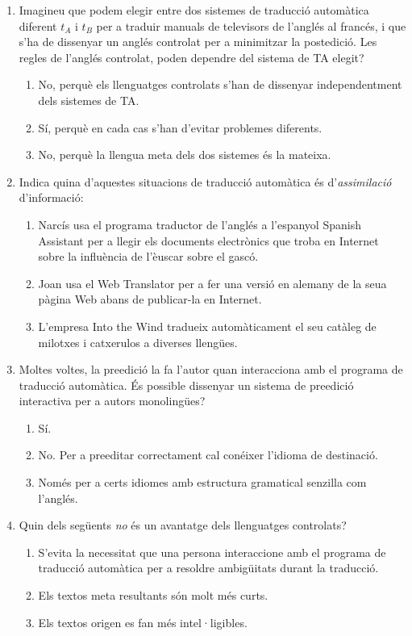 \begin{enumerate}
\item Imagineu que podem elegir entre dos sistemes de traducció
  automàtica diferent $t_A$ i $t_B$ per a traduir manuals de
  televisors de l'anglés al francés, i que s'ha de dissenyar un anglés
  controlat per a minimitzar la postedició. Les regles de l'anglés
  controlat, poden dependre del sistema de TA elegit?
  \begin{enumerate}
  \item No, perquè els llenguatges controlats s'han de dissenyar
    independentment dels sistemes de TA.
  \item Sí, perquè en cada cas s'han d'evitar problemes diferents.
  \item No, perquè la llengua meta dels dos sistemes és la mateixa.
  \end{enumerate}

\item Indica quina d'aquestes situacions de traducció automàtica és
  d'\emph{assimilació} d'informació:
  \begin{enumerate}
  \item Narcís usa el programa traductor de l'anglés a l'espanyol
    Spanish Assistant per a llegir els documents electrònics que troba
    en Internet sobre la influència de l'èuscar sobre el gascó.
  \item Joan usa el Web Translator per a fer una versió en alemany de
    la seua pàgina Web abans de publicar-la en Internet.
  \item L'empresa Into the Wind tradueix automàticament el seu catàleg
    de milotxes i catxerulos a diverses llengües.
  \end{enumerate}

\item Moltes voltes, la preedició la fa l'autor quan interacciona amb
  el programa de traducció automàtica. És possible dissenyar un
  sistema de preedició interactiva per a autors monolingües?
  \begin{enumerate}
  \item Sí.
  \item No. Per a preeditar correctament cal conéixer l'idioma de
    destinació.
  \item Només per a certs idiomes amb estructura gramatical senzilla
    com l'anglés.
  \end{enumerate}

\item Quin dels següents \emph{no} és un avantatge dels llenguatges
  controlats?
  \begin{enumerate}
  \item S'evita la necessitat que una persona interaccione amb el
    programa de traducció automàtica per a resoldre ambigüitats durant
    la traducció.
  \item Els textos meta resultants són molt més curts.
  \item Els textos origen es fan més intel·ligibles.
\end{enumerate}


\end{enumerate}
